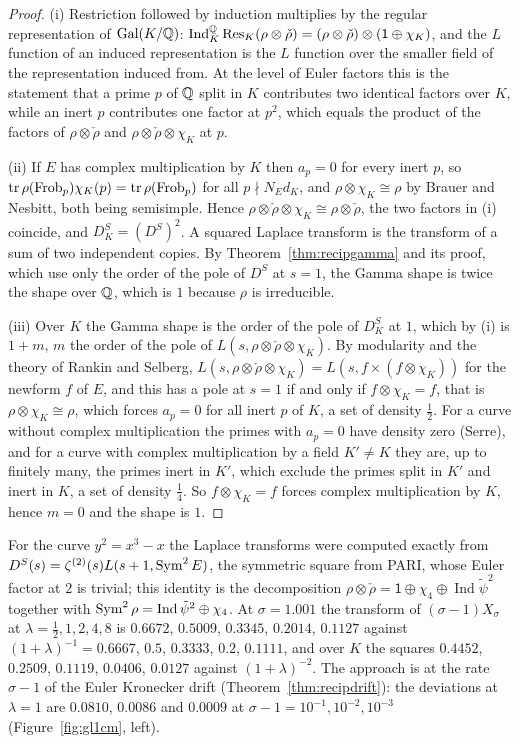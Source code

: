 \begin{proof}
(i) Restriction followed by induction multiplies by the regular representation of $\operatorname{Gal}(K/\mathbb{Q})$: $\operatorname{Ind}_K^{\mathbb{Q}}\operatorname{Res}_K(\rho\otimes\check\rho)=(\rho\otimes\check\rho)\otimes(\mathsf 1\oplus\chi_K)$, and the $L$ function of an induced representation is the $L$ function over the smaller field of the representation induced from. At the level of Euler factors this is the statement that a prime $p$ of $\mathbb{Q}$ split in $K$ contributes two identical factors over $K$, while an inert $p$ contributes one factor at $p^2$, which equals the product of the factors of $\rho\otimes\check\rho$ and $\rho\otimes\check\rho\otimes\chi_K$ at $p$.

(ii) If $E$ has complex multiplication by $K$ then $a_p=0$ for every inert $p$, so $\operatorname{tr}\rho(\operatorname{Frob}_p)\chi_K(p)=\operatorname{tr}\rho(\operatorname{Frob}_p)$ for all $p\nmid N_Ed_K$, and $\rho\otimes\chi_K\cong\rho$ by Brauer and Nesbitt, both being semisimple. Hence $\rho\otimes\check\rho\otimes\chi_K\cong\rho\otimes\check\rho$, the two factors in (i) coincide, and $D_K^S=(D^S)^2$. A squared Laplace transform is the transform of a sum of two independent copies. By Theorem~\ref{thm:recipgamma} and its proof, which use only the order of the pole of $D^S$ at $s=1$, the Gamma shape is twice the shape over $\mathbb{Q}$, which is $1$ because $\rho$ is irreducible.

(iii) Over $K$ the Gamma shape is the order of the pole of $D^S_K$ at $1$, which by (i) is $1+m$, $m$ the order of the pole of $L(s,\rho\otimes\check\rho\otimes\chi_K)$. By modularity and the theory of Rankin and Selberg, $L(s,\rho\otimes\check\rho\otimes\chi_K)=L(s,f\times(f\otimes\chi_K))$ for the newform $f$ of $E$, and this has a pole at $s=1$ if and only if $f\otimes\chi_K=f$, that is $\rho\otimes\chi_K\cong\rho$, which forces $a_p=0$ for all inert $p$ of $K$, a set of density $\frac12$. For a curve without complex multiplication the primes with $a_p=0$ have density zero (Serre), and for a curve with complex multiplication by a field $K'\ne K$ they are, up to finitely many, the primes inert in $K'$, which exclude the primes split in $K'$ and inert in $K$, a set of density $\frac14$. So $f\otimes\chi_K=f$ forces complex multiplication by $K$, hence $m=0$ and the shape is $1$.
\end{proof}

For the curve $y^2=x^3-x$ the Laplace transforms were computed exactly from $D^S(s)=\zeta^{(2)}(s)L(s+1,\operatorname{Sym}^2E)$, the symmetric square from PARI, whose Euler factor at $2$ is trivial; this identity is the decomposition $\rho\otimes\check\rho=\mathsf 1\oplus\chi_4\oplus\operatorname{Ind}\tilde\psi^2$ together with $\operatorname{Sym}^2\rho=\operatorname{Ind}\tilde\psi^2\oplus\chi_4$. At $\sigma=1.001$ the transform of $(\sigma-1)X_\sigma$ at $\lambda=\frac12,1,2,4,8$ is $0.6672$, $0.5009$, $0.3345$, $0.2014$, $0.1127$ against $(1+\lambda)^{-1}=0.6667$, $0.5$, $0.3333$, $0.2$, $0.1111$, and over $K$ the squares $0.4452$, $0.2509$, $0.1119$, $0.0406$, $0.0127$ against $(1+\lambda)^{-2}$. The approach is at the rate $\sigma-1$ of the Euler Kronecker drift (Theorem~\ref{thm:recipdrift}): the deviations at $\lambda=1$ are $0.0810$, $0.0086$ and $0.0009$ at $\sigma-1=10^{-1},10^{-2},10^{-3}$ (Figure~\ref{fig:gl1cm}, left).

